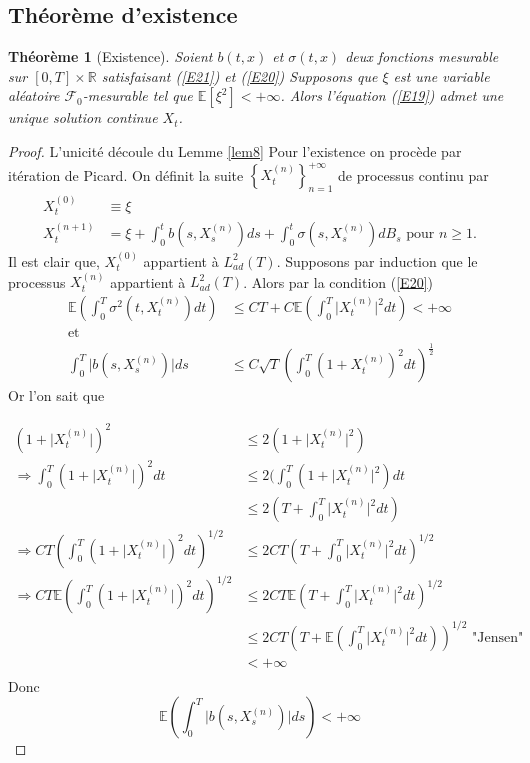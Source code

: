 \documentclass[A4paper,12pt]{report}
\newtheorem{theorem}{Th\'eor\`eme}[chapter]
\newcommand{\E}{{\mathbb{E}}}
\begin{document}
\subsection{Théorème d'existence}
\begin{theorem}[Existence] Soient $b(t, x)$ et $\sigma(t, x)$ deux fonctions mesurable sur $[0, T] \times \mathbb{R}$ satisfaisant (\ref{E21}) et (\ref{E20}) Supposons que $\xi$ est une variable aléatoire $\mathcal{F}_{0}$-mesurable tel que $\E\left[\xi^{2}\right]<+\infty$. Alors l'équation (\ref{E19}) admet une unique solution continue $X_{t}$.
\end{theorem}
\begin{proof}
L'unicité découle du Lemme \ref{lem8}
Pour l'existence on procède par itération de Picard.
On définit la suite $\left\{X_{t}^{(n)}\right\}_{n=1}^{+\infty}$ de processus continu par
$$
\begin{aligned}
X_{t}^{(0)} & \equiv \xi \\
X_{t}^{(n+1)} & =\xi+\int_{0}^{t} b\left(s, X_{s}^{(n)}\right) d s+\int_{0}^{t} \sigma\left(s, X_{s}^{(n)}\right) d B_{s} \text { pour } n \geq 1 .
\end{aligned}
$$
Il est clair que, $X_{t}^{(0)}$ appartient à $L_{a d}^{2}(T)$. Supposons par induction que le processus $X_{t}^{(n)}$ appartient à $L_{a d}^{2}(T)$. Alors par la condition (\ref{E20})
$$
\begin{aligned}
\E \left( \int_{0}^{T} \sigma^{2}\left(t, X_{t}^{(n)}\right) d t \right) & \leq C T+C \E \left(\int_{0}^{T}\lvert X_{t}^{(n)}\rvert^{2} d t \right)<+\infty \\
\text{et}\\ 
\int_{0}^{T}\lvert b\left(s, X_{s}^{(n)}\right)\rvert d s & \leq C \sqrt{T}\left(\int_{0}^{T}\left(1+X_{t}^{(n)}\right)^{2} d t\right)^{\frac{1}{2}}
\end{aligned}
$$
Or l'on sait que 

\begin{align*}
(1+\lvert X_{t}^{(n)}\rvert)^{2} & \leq 2(1+\lvert X_{t}^{(n)}\rvert ^{2})\\
\Rightarrow \int_{0}^{T}(1+\lvert X_{t}^{(n)}\rvert)^{2}dt &\leq 2(\int_{0}^{T}(1+\lvert X_{t}^{(n)}\rvert^{2})dt\\
&\leq 2(T + \int_{0}^{T} \lvert X_{t}^{(n)}\rvert^{2}dt)\\
\Rightarrow CT \left( \int_{0}^{T}(1+\lvert X_{t}^{(n)}\rvert)^{2}dt \right)^{1/2}&\leq 2CT  \left( T+\int_{0}^{T} \lvert X_{t}^{(n)}\rvert^{2}dt \right)^{1/2}\\
\Rightarrow CT \E\left( \int_{0}^{T}(1+\lvert X_{t}^{(n)}\rvert)^{2}dt \right)^{1/2} &\leq 2 CT 
\E \left( T+\int_{0}^{T} \lvert X_{t}^{(n)}\rvert^{2}dt \right)^{1/2}\\
& \leq 2CT \left( T + \E(\int_{0}^{T} \lvert X_{t}^{(n)}\rvert^{2}dt) \right)^{1/2} \text{ "Jensen"}\\
&< +\infty\\
\end{align*}
Donc $$\E \left(\int_{0}^{T} \lvert b(s, X_s ^{(n)})\rvert ds \right)< +\infty$$


\end{proof}
\end{document}
